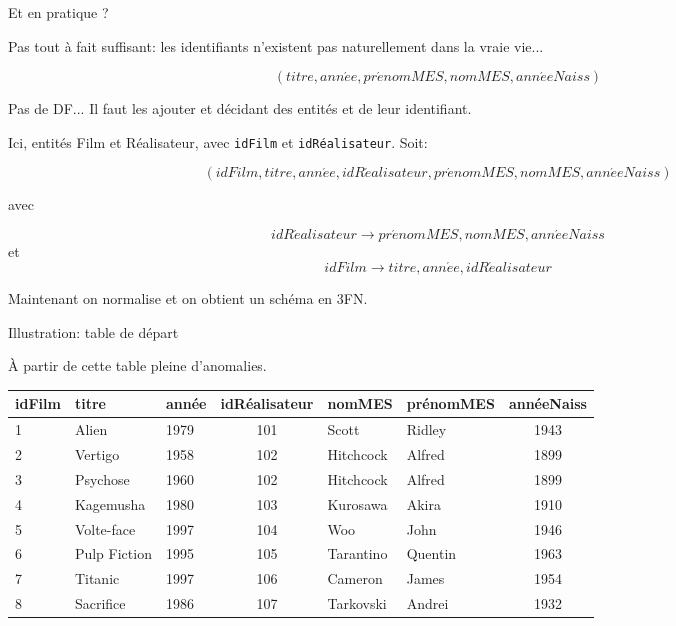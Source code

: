 \begin{frame}{Et en pratique ?}

Pas tout à fait suffisant: les identifiants n'existent pas naturellement dans la vraie vie...

\vfill

$$(titre, ann\acute{e}e, pr\acute{e}nomMES, nomMES, ann\acute{e}eNaiss)$$

\vfill 

Pas de DF... Il faut les \alert{ajouter} et décidant des \alert{entités} et 
de leur identifiant.

\vfill

Ici, entités Film et Réalisateur, avec \texttt{idFilm} 
et \texttt{idRéalisateur}. Soit: 


$$(idFilm, titre, ann\acute{e}e, idR\acute{e}alisateur, pr\acute{e}nomMES, nomMES, ann\acute{e}eNaiss)$$

avec 

$$idR\acute{e}alisateur \to pr\acute{e}nomMES, nomMES, ann\acute{e}eNaiss$$
et
$$idFilm \to titre, ann\acute{e}e, idR\acute{e}alisateur$$

\begin{blocgauche}
Maintenant on normalise et on obtient un schéma en 3FN.
\end{blocgauche}
\end{frame}


\begin{frame}{Illustration: table de départ}

À partir de cette table pleine d'anomalies.

\begin{small}
\begin{center}
\begin{tabular}{l|l|l|c|l|l|c}
 idFilm & titre &  année &  idRéalisateur & nomMES &  prénomMES &  annéeNaiss \\
\hline
1 & Alien & 1979 & 101 & Scott & Ridley & 1943\\
2 & Vertigo  & 1958 & 102 & Hitchcock & Alfred & 1899\\
3 & Psychose & 1960 &102 &  Hitchcock & Alfred & 1899\\
4 & Kagemusha & 1980 & 103 & Kurosawa & Akira & 1910\\
5 & Volte-face & 1997 & 104 & Woo & John & 1946\\
6 & Pulp Fiction & 1995 & 105 & Tarantino & Quentin & 1963 \\
7 & Titanic & 1997 & 106 & Cameron & James & 1954\\
8 & Sacrifice & 1986 & 107 & Tarkovski & Andrei &1932\\
\hline
\end{tabular}
\end{center}
\end{small}

\end{frame}

